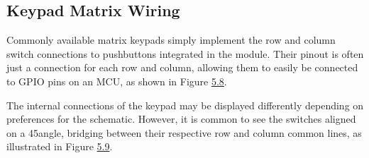\documentclass[
  9pt,
  letterpaper,
  abstract,
  titlepage]{scrbook}
\begin{document}
\subsection{Keypad Matrix Wiring}\label{keypad-matrix-wiring}

Commonly available matrix keypads simply implement the row and column
switch connections to pushbuttons integrated in the module. Their pinout
is often just a connection for each row and column, allowing them to
easily be connected to GPIO pins on an MCU, as shown in Figure
\hyperref[fig:keypadwiring]{5.8}.

The internal connections of the keypad may be displayed differently
depending on preferences for the schematic. However, it is common to see
the switches aligned on a 45angle, bridging between their respective row
and column common lines, as illustrated in Figure
\hyperref[fig:keypadschematic]{5.9}.
\end{document}
